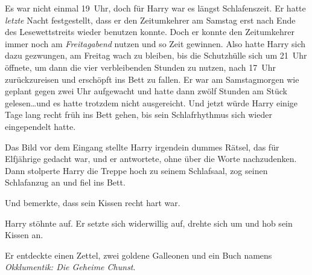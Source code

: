 Es war nicht einmal 19~Uhr, doch für Harry war es längst Schlafenszeit. Er hatte \emph{letzte} Nacht festgestellt, dass er den Zeitumkehrer am Samstag erst nach Ende des Lesewettstreits wieder benutzen konnte. Doch er konnte den Zeitumkehrer immer noch am \emph{Freitagabend} nutzen und so Zeit gewinnen. Also hatte Harry sich dazu gezwungen, am Freitag wach zu bleiben, bis die Schutzhülle sich um 21~Uhr öffnete, um dann die vier verbleibenden Stunden zu nutzen, nach 17~Uhr zurückzureisen und erschöpft ins Bett zu fallen. Er war am Samstagmorgen wie geplant gegen zwei Uhr aufgewacht und hatte dann zwölf Stunden am Stück gelesen…und es hatte trotzdem nicht ausgereicht. Und jetzt würde Harry einige Tage lang recht früh ins Bett gehen, bis sein Schlafrhythmus sich wieder eingependelt hatte.

Das Bild vor dem Eingang stellte Harry irgendein dummes Rätsel, das für Elfjährige gedacht war, und er antwortete, ohne über die Worte nachzudenken. Dann stolperte Harry die Treppe hoch zu seinem Schlafsaal, zog seinen Schlafanzug an und fiel ins Bett.

Und bemerkte, dass sein Kissen recht hart war.

Harry stöhnte auf. Er setzte sich widerwillig auf, drehte sich um und hob sein Kissen an.

Er entdeckte einen Zettel, zwei goldene Galleonen und ein Buch namens \emph{Okklumentik: Die Geheime Chunst}.%

